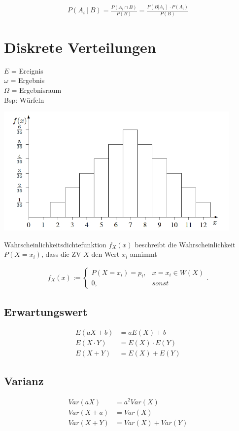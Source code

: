 \documentclass[10pt,a4paper]{article}
\begin{document}
  \begin{mdframed}[style=exercise]
    \begin{align}
        P (A_i \ |\ B) = \frac{P(A_i \cap B)}{P(B)} = \frac{P(B | A_i) \cdot P(A_i)}{P(B)}
    \end{align}
  \end{mdframed}

  \newpage

  \section{Diskrete Verteilungen}
  $E$ = Ereignis\\
  $\omega$ = Ergebnis\\
  $\Omega$ = Ergebnisraum\\

  Bsp: Würfeln
  \begin{center}
      \includegraphics[width=.22\textwidth]{./img/wuerfel.png}
  \end{center}
Wahrscheinlichkeitsdichtefunktion $f_X(x)$ beschreibt die Wahrscheinlichkeit $P(X=x_i)$, 
dass die ZV $X$ den Wert $x_i$ annimmt
  \begin{mdframed}[style=exercise]
    \begin{align}
        f_X(x):=\left\{\begin{array}{ll} P(X=x_i) = p_i,  & x = x_i\in W(X) \\
         0, & sonst\end{array}\right. .
    \end{align}
  \end{mdframed}

\subsection{Erwartungswert}
  \begin{mdframed}[style=exercise]
    \begin{align}
        E(aX +b) &= aE(X)+b \\
        E(X \cdot Y) &= E(X) \cdot E(Y)\\
        E(X + Y) &= E(X) + E(Y)
    \end{align}
  \end{mdframed}

\subsection{Varianz}
  \begin{mdframed}[style=exercise]
    \begin{align}
        Var(aX) &= a^2 Var(X) \\
        Var(X + a) &= Var(X)  \\
        Var(X + Y) &=  Var(X) + Var(Y)\\
    \end{align}
  \end{mdframed}
\end{document}
